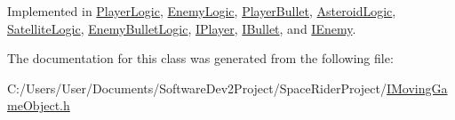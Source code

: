 Implemented in \hyperlink{class_player_logic_a765133271ba47a6fa9b2b45136f1fe73}{Player\+Logic}, \hyperlink{class_enemy_logic_a8dd48fa112c41249e46728d7ec8f820e}{Enemy\+Logic}, \hyperlink{class_player_bullet_ab4e6b1485e9a63ddc00effc7532a9b09}{Player\+Bullet}, \hyperlink{class_asteroid_logic_a18e01f832db4f109799fc01c8c15efcd}{Asteroid\+Logic}, \hyperlink{class_satellite_logic_aa8f39f77a7783f8a97698ea750b34e94}{Satellite\+Logic}, \hyperlink{class_enemy_bullet_logic_a42d10bdfde42178e272997de9b387398}{Enemy\+Bullet\+Logic}, \hyperlink{class_i_player_a5b417cd92b4463e1c296a627430282b6}{I\+Player}, \hyperlink{class_i_bullet_ac1252496738126ec94a97512011b9112}{I\+Bullet}, and \hyperlink{class_i_enemy_a3e44ca5e5fabcfd71b26657eba26e5a2}{I\+Enemy}.



The documentation for this class was generated from the following file\+:\begin{DoxyCompactItemize}
\item 
C\+:/\+Users/\+User/\+Documents/\+Software\+Dev2\+Project/\+Space\+Rider\+Project/\hyperlink{_i_moving_game_object_8h}{I\+Moving\+Game\+Object.\+h}\end{DoxyCompactItemize}
